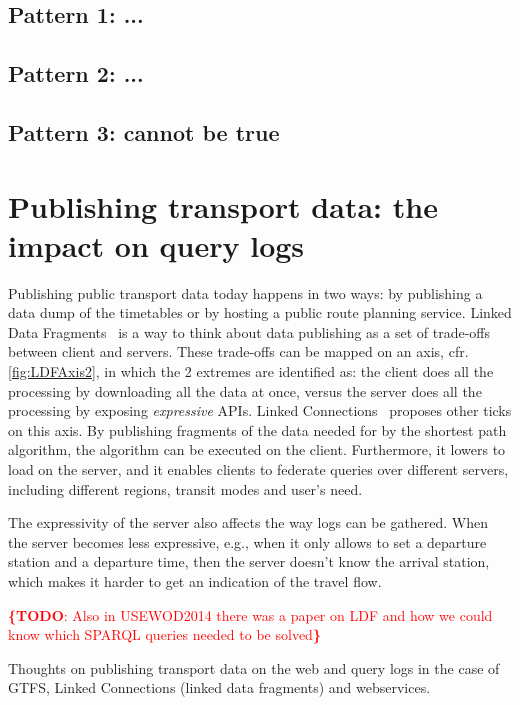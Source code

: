 \documentclass{sig-alternate}
\newcommand{\todo}[1]{\noindent\textcolor{red}{{\bf \{TODO}: #1{\bf \}}}}
\begin{document}
\subsection{Pattern 1: ...}
\label{sec:pattern1}

\subsection{Pattern 2: ...}
\label{sec:pattern2}

\subsection{Pattern 3: cannot be true}
\label{sec:pattern3}

\section{Publishing transport data: the impact on query logs}
\label{sec:publishing}

Publishing public transport data today happens in two ways: by publishing a data dump of the timetables or by hosting a public route planning service.
Linked Data Fragments~\cite{ldf} is a way to think about data publishing as a set of trade-offs between client and servers.
These trade-offs can be mapped on an axis, cfr. \cref{fig:LDFAxis2}, in which the 2 extremes are identified as: the client does all the processing by downloading all the data at once, versus the server does all the processing by exposing \emph{expressive} APIs.
Linked Connections~\cite{lc} proposes other ticks on this axis.
By publishing fragments of the data needed for by the shortest path algorithm, the algorithm can be executed on the client.
Furthermore, it lowers to load on the server, and it enables clients to federate queries over different servers, including different regions, transit modes and user's need.



The expressivity of the server also affects the way logs can be gathered.
When the server becomes less expressive, e.g., when it only allows to set a departure station and a departure time, then the server doesn't know the arrival station, which makes it harder to get an indication of the travel flow.

\todo{Also in USEWOD2014 there was a paper on LDF and how we could know which SPARQL queries needed to be solved}

Thoughts on publishing transport data on the web and query logs in the case of GTFS, Linked Connections\cite{lc} (linked data fragments\cite{ldf}) and webservices.
\end{document}
